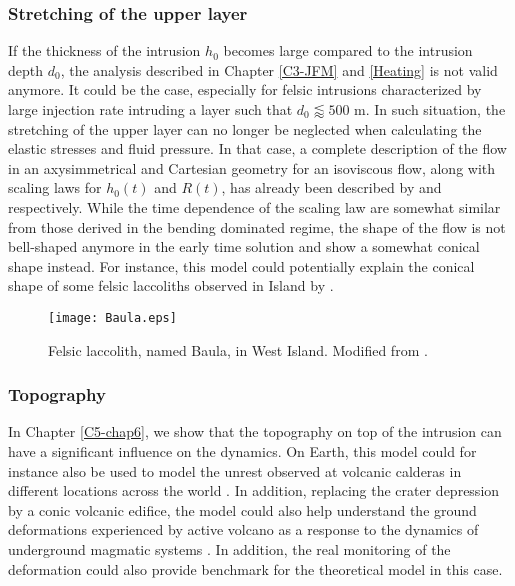 \subsubsection*{Stretching of the upper layer}
\label{subsubsection}

If the thickness of the intrusion  $h_0$ becomes large compared to the
intrusion depth $d_0$, the  analysis described in Chapter \ref{C3-JFM}
and  \ref{Heating}  is  not  valid  anymore. It  could  be  the  case,
especially for felsic intrusions characterized by large injection rate
intruding a layer such that $d_0\lessapprox 500$ m. In such situation,
the stretching  of the  upper layer  can no  longer be  neglected when
calculating the elastic stresses and  fluid pressure.  In that case, a
complete description  of the flow  in an axysimmetrical  and Cartesian
geometry for an isoviscous flow,  along with scaling laws for $h_0(t)$
and $R(t)$,  has already  been described by  \citet{Lister:2013ia} and
\citet{Anonymous:QWXp_4JV} respectively.  While the time dependence of
the scaling law are somewhat similar from those derived in the bending
dominated regime, the shape of the  flow is not bell-shaped anymore in
the early time solution and show a somewhat conical shape instead. For
instance, this  model could potentially  explain the conical  shape of
some     felsic      laccoliths     observed     in      Island     by
\citet{Anonymous:jHnLP36x}.
\begin{figure}[h!]
  \begin{center}
    \graphicspath{ {/Users/thorey/Documents/These/Manuscript/Figure/Chapter7/} }
    \texttt{[image: Baula.eps]}
    \caption{Felsic laccolith, named Baula,  in West Island.  Modified
      from \citet{Anonymous:jHnLP36x}.}
    \label{C7-Baula}
  \end{center}
\end{figure}

\subsubsection{Topography}
\label{sec:topography-1}

In Chapter \ref{C5-chap6},  we show that the topography on  top of the
intrusion can have a significant  influence on the dynamics. On Earth,
this  model could  for  instance  also be  used  to  model the  unrest
observed at volcanic calderas in  different locations across the world
\citep{Macedonio:2014et}. In addition, replacing the crater depression
by a conic volcanic edifice, the  model could also help understand the
ground deformations experienced by active volcano as a response to the
dynamics         of        underground         magmatic        systems
\citep{Cayol:2014vo,Pedersen:2004kp,Patane:2006hn,Bonaccorso:2001iw,ChadwickJr:1995cz,Cannavo:2015fk}.
In addition, the real monitoring of the deformation could also provide
benchmark for the theoretical model in this case.

